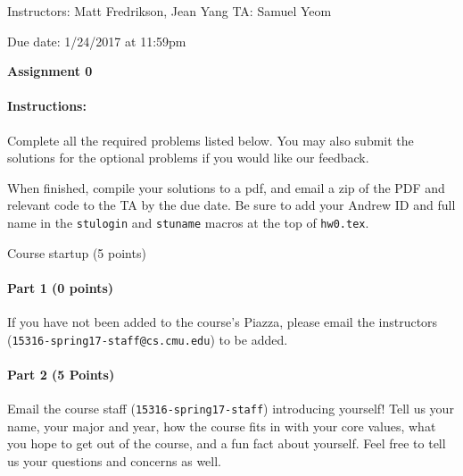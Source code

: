 \documentclass[11pt]{article}
\newcommand*{\stuname}{}
\newcommand*{\assignmentnumb}{0}
\begin{document}
\centerline{Instructors: Matt Fredrikson, Jean Yang \hfill TA: Samuel Yeom} 
\vspace{0.5ex}
Due date: 1/24/2017 at 11:59pm \\
\vspace{1.5ex}
\centerline{\Large\bf Assignment \assignmentnumb}
\vspace{0.5ex}
\centerline{\Large\bf \stuname}

\paragraph{Instructions:} 

Complete all the required problems listed below. You may also submit the solutions for the optional problems if you would like our feedback.

When finished, compile your solutions to a pdf, and email a zip of the PDF and relevant code to the TA by the due date. Be sure to add your Andrew ID and full name in the \texttt{stulogin} and \texttt{stuname} macros at the top of \texttt{hw0.tex}.

\begin{problem}{Course startup (5 points)}

\paragraph{Part 1 (0 points)}
If you have not been added to the course's Piazza, please email the instructors (\texttt{15316-spring17-staff@cs.cmu.edu}) to be added.

\paragraph{Part 2 (5 Points)}

Email the course staff (\texttt{15316-spring17-staff}) introducing yourself! Tell us your name, your major and year, how the course fits in with your core values, what you hope to get out of the course, and a fun fact about yourself. Feel free to tell us your questions and concerns as well.

\end{problem}
\end{document}
